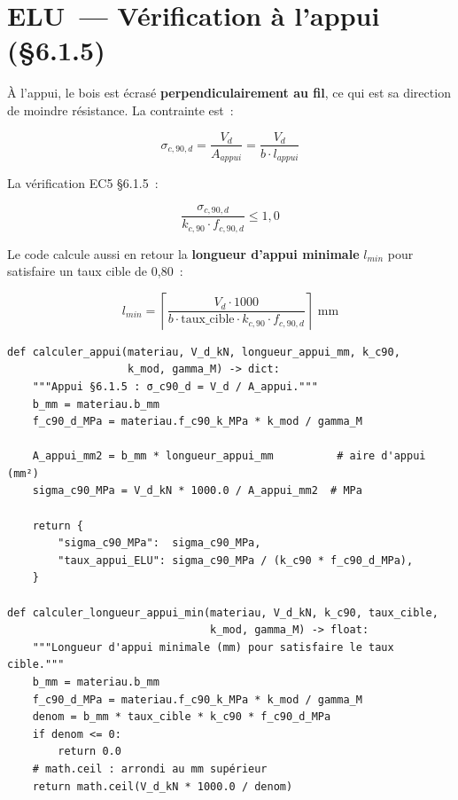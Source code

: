 \section{ELU~--- V\'erification \`a l'appui (\S{}6.1.5)}

\`A l'appui, le bois est \'ecras\'e \textbf{perpendiculairement au fil},
ce qui est sa direction de moindre r\'esistance. La contrainte est~:

\begin{equation}
\sigma_{c,90,d} = \frac{V_d}{A_{appui}} = \frac{V_d}{b \cdot l_{appui}}
\end{equation}

La v\'erification EC5 \S{}6.1.5~:

\begin{equation}
\frac{\sigma_{c,90,d}}{k_{c,90} \cdot f_{c,90,d}} \leq 1{,}0
\end{equation}

Le code calcule aussi en retour la \textbf{longueur d'appui minimale}
$l_{min}$ pour satisfaire un taux cible de 0,80~:

\begin{equation}
l_{min} = \left\lceil \frac{V_d \cdot 1000}{b \cdot \text{taux\_cible} \cdot k_{c,90} \cdot f_{c,90,d}} \right\rceil \text{ mm}
\label{eq:lmin}
\end{equation}

\begin{lstlisting}[style=python, caption={\fichier{ec5/elu.py} --- appui et longueur minimale d'appui}]
def calculer_appui(materiau, V_d_kN, longueur_appui_mm, k_c90,
                   k_mod, gamma_M) -> dict:
    """Appui §6.1.5 : σ_c90_d = V_d / A_appui."""
    b_mm = materiau.b_mm
    f_c90_d_MPa = materiau.f_c90_k_MPa * k_mod / gamma_M

    A_appui_mm2 = b_mm * longueur_appui_mm          # aire d'appui (mm²)
    sigma_c90_MPa = V_d_kN * 1000.0 / A_appui_mm2  # MPa

    return {
        "sigma_c90_MPa":  sigma_c90_MPa,
        "taux_appui_ELU": sigma_c90_MPa / (k_c90 * f_c90_d_MPa),
    }

def calculer_longueur_appui_min(materiau, V_d_kN, k_c90, taux_cible,
                                k_mod, gamma_M) -> float:
    """Longueur d'appui minimale (mm) pour satisfaire le taux cible."""
    b_mm = materiau.b_mm
    f_c90_d_MPa = materiau.f_c90_k_MPa * k_mod / gamma_M
    denom = b_mm * taux_cible * k_c90 * f_c90_d_MPa
    if denom <= 0:
        return 0.0
    # math.ceil : arrondi au mm supérieur
    return math.ceil(V_d_kN * 1000.0 / denom)
\end{lstlisting}


